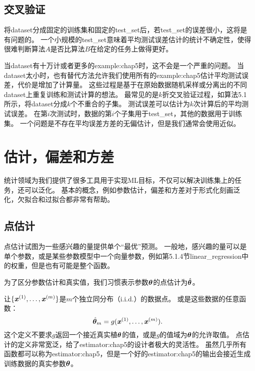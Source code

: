 \subsection{交叉验证}
\label{sec:cross_validation}
将\gls{dataset}分成固定的训练集和固定的\gls{test_set}后，若\gls{test_set}的误差很小，这将是有问题的。
一个小规模的\gls{test_set}意味着平均测试误差估计的统计不确定性，使得很难判断算法$A$是否比算法$B$在给定的任务上做得更好。


当\gls{dataset}有十万计或者更多的\gls{example:chap5}时，这不会是一个严重的问题。
当\gls{dataset}太小时，也有替代方法允许我们使用所有的\gls{example:chap5}估计平均测试误差，代价是增加了计算量。
这些过程是基于在原始数据随机采样或分离出的不同\gls{dataset}上重复训练和测试计算的想法。
最常见的是$k$折交叉验证过程，如算法5.1所示，将\gls{dataset}分成$k$个不重合的子集。
测试误差可以估计为$k$次计算后的平均测试误差。
在第$i$次测试时，数据的第$i$个子集用于\gls{test_set}，其他的数据用于训练集。
一个问题是不存在平均误差方差的无偏估计\citep{Bengio-Grandvalet-JMLR-04}，但是我们通常会使用近似。

\section{估计，偏差和方差}
\label{sec:estimators_bias_and_variance}
统计领域为我们提供了很多工具用于实现\gls{ML}目标，不仅可以解决训练集上的任务，还可以泛化。
基本的概念，例如参数估计，偏差和方差对于形式化刻画泛化，欠拟合和过拟合都非常有帮助。

\subsection{点估计}
\label{sec:point_estimation}
点估计试图为一些感兴趣的量提供单个“最优”预测。
一般地，感兴趣的量可以是单个参数，或是某些参数模型中一个向量参数，例如第5.1.4节\gls{linear_regression}中的权重，但是也有可能是整个函数。

为了区分参数估计和真实值，我们习惯表示参数$\boldsymbol{\theta}$的点估计为$\hat{\boldsymbol{\theta}}$。

让$\{\boldsymbol{\mathit{x}}^{(1)},\dots,\boldsymbol{\mathit{x}}^{(m)}\}$是$m$个独立同分布（i.i.d.）的数据点。
或是这些数据的任意函数：
\begin{equation}
    \hat{\boldsymbol{\theta}}_m = g(\boldsymbol{\mathit{x}}^{(1)}, \dots, \boldsymbol{\mathit{x}}^{(m)}) .
\end{equation}
这个定义不要求$g$返回一个接近真实植$\boldsymbol{\theta}$的值，或是$g$的值域为$\boldsymbol{\theta}$的允许取值。
点估计的定义非常宽泛，给了\gls{estimator:chap5}的设计者极大的灵活性。
虽然几乎所有函数都可以称为\gls{estimator:chap5}，但是一个好的\gls{estimator:chap5}的输出会接近生成训练数据的真实参数$\boldsymbol{\theta}$。

